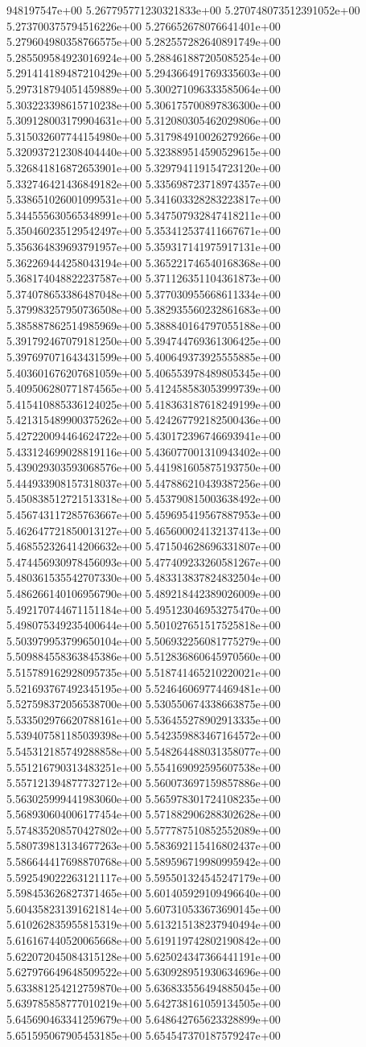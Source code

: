 948197547e+00	5.267795771230321833e+00	5.270748073512391052e+00	5.273700375794516226e+00	5.276652678076641401e+00	5.279604980358766575e+00	5.282557282640891749e+00	5.285509584923016924e+00	5.288461887205085254e+00	5.291414189487210429e+00	5.294366491769335603e+00	5.297318794051459889e+00	5.300271096333585064e+00	5.303223398615710238e+00	5.306175700897836300e+00	5.309128003179904631e+00	5.312080305462029806e+00	5.315032607744154980e+00	5.317984910026279266e+00	5.320937212308404440e+00	5.323889514590529615e+00	5.326841816872653901e+00	5.329794119154723120e+00	5.332746421436849182e+00	5.335698723718974357e+00	5.338651026001099531e+00	5.341603328283223817e+00	5.344555630565348991e+00	5.347507932847418211e+00	5.350460235129542497e+00	5.353412537411667671e+00	5.356364839693791957e+00	5.359317141975917131e+00	5.362269444258043194e+00	5.365221746540168368e+00	5.368174048822237587e+00	5.371126351104361873e+00	5.374078653386487048e+00	5.377030955668611334e+00	5.379983257950736508e+00	5.382935560232861683e+00	5.385887862514985969e+00	5.388840164797055188e+00	5.391792467079181250e+00	5.394744769361306425e+00	5.397697071643431599e+00	5.400649373925555885e+00	5.403601676207681059e+00	5.406553978489805345e+00	5.409506280771874565e+00	5.412458583053999739e+00	5.415410885336124025e+00	5.418363187618249199e+00	5.421315489900375262e+00	5.424267792182500436e+00	5.427220094464624722e+00	5.430172396746693941e+00	5.433124699028819116e+00	5.436077001310943402e+00	5.439029303593068576e+00	5.441981605875193750e+00	5.444933908157318037e+00	5.447886210439387256e+00	5.450838512721513318e+00	5.453790815003638492e+00	5.456743117285763667e+00	5.459695419567887953e+00	5.462647721850013127e+00	5.465600024132137413e+00	5.468552326414206632e+00	5.471504628696331807e+00	5.474456930978456093e+00	5.477409233260581267e+00	5.480361535542707330e+00	5.483313837824832504e+00	5.486266140106956790e+00	5.489218442389026009e+00	5.492170744671151184e+00	5.495123046953275470e+00	5.498075349235400644e+00	5.501027651517525818e+00	5.503979953799650104e+00	5.506932256081775279e+00	5.509884558363845386e+00	5.512836860645970560e+00	5.515789162928095735e+00	5.518741465210220021e+00	5.521693767492345195e+00	5.524646069774469481e+00	5.527598372056538700e+00	5.530550674338663875e+00	5.533502976620788161e+00	5.536455278902913335e+00	5.539407581185039398e+00	5.542359883467164572e+00	5.545312185749288858e+00	5.548264488031358077e+00	5.551216790313483251e+00	5.554169092595607538e+00	5.557121394877732712e+00	5.560073697159857886e+00	5.563025999441983060e+00	5.565978301724108235e+00	5.568930604006177454e+00	5.571882906288302628e+00	5.574835208570427802e+00	5.577787510852552089e+00	5.580739813134677263e+00	5.583692115416802437e+00	5.586644417698870768e+00	5.589596719980995942e+00	5.592549022263121117e+00	5.595501324545247179e+00	5.598453626827371465e+00	5.601405929109496640e+00	5.604358231391621814e+00	5.607310533673690145e+00	5.610262835955815319e+00	5.613215138237940494e+00	5.616167440520065668e+00	5.619119742802190842e+00	5.622072045084315128e+00	5.625024347366441191e+00	5.627976649648509522e+00	5.630928951930634696e+00	5.633881254212759870e+00	5.636833556494885045e+00	5.639785858777010219e+00	5.642738161059134505e+00	5.645690463341259679e+00	5.648642765623328899e+00	5.651595067905453185e+00	5.654547370187579247e+00
